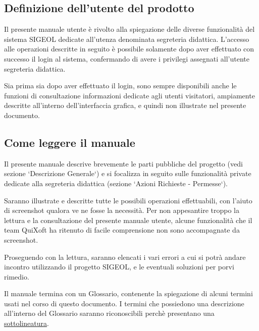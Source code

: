 \documentclass[11pt,a4paper]{article}
\begin{document}
\subsection{Definizione dell'utente del prodotto}
Il presente manuale utente è rivolto alla spiegazione delle diverse funzionalità del sistema SIGEOL dedicate all'utenza denominata segreteria didattica.
L'accesso alle operazioni descritte in seguito è possibile solamente dopo aver effettuato con successo il login al sistema, confermando di avere i privilegi assegnati all'utente segreteria didattica.

Sia prima sia dopo aver effettuato il login, sono sempre disponibili anche le funzioni di consultazione informazioni dedicate agli utenti visitatori, ampiamente descritte all'interno dell'interfaccia grafica, e quindi non illustrate nel presente documento.
\subsection{Come leggere il manuale}
Il presente manuale descrive brevemente le parti pubbliche del progetto (vedi sezione `Descrizione Generale`) e si focalizza in seguito sulle funzionalità private dedicate alla segreteria didattica (sezione `Azioni Richieste - Permesse`).

Saranno illustrate e descritte tutte le possibili operazioni effettuabili, con l'aiuto di screenshot qualora ve ne fosse la necessità.
Per non appesantire troppo la lettura e la consultazione del presente manuale utente, alcune funzionalità che il team QuiXoft ha ritenuto di facile comprensione non sono accompagnate da screenshot.

Proseguendo con la lettura, saranno elencati i vari errori a cui si potrà andare incontro utilizzando il progetto SIGEOL, e le eventuali soluzioni per porvi rimedio.

Il manuale termina con un Glossario, contenente la spiegazione di alcuni termini usati nel corso di questo documento.
I termini che possiedono una descrizione all'interno del Glossario saranno riconoscibili perchè presentano una \underline{sottolineatura}.
\end{document}
